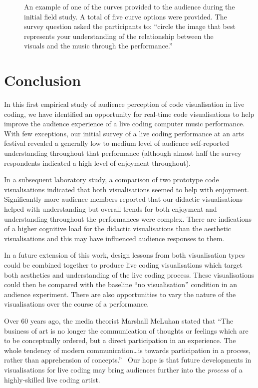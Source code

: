 \documentclass{sig-alternate}
\begin{document}
\begin{figure}
\centering
{}
\caption{An example of one of the curves provided to the audience
during the initial field study. A total of five curve options were
provided. The survey question asked the participants to: ``circle the
image that best represents your understanding of the
relationship between the visuals and the music through the
performance.''}
\label{fig:understanding-over-time}
\end{figure}

\section{Conclusion}

In this first empirical study of audience perception of code
visualisation in live coding, we have identified an opportunity for
real-time code visualisations to help improve the audience experience
of a live coding computer music performance. With few exceptions, our
initial survey of a live coding performance at an arts festival
revealed a generally low to medium level of audience self-reported
understanding throughout that performance (although almost half the
survey respondents indicated a high level of enjoyment throughout).

In a subsequent laboratory study, a comparison of two prototype code
visualisations indicated that both visualisations seemed to help with
enjoyment. Significantly more audience members reported that our
didactic visualisations helped with understanding but overall trends
for both enjoyment and understanding throughout the performances were
complex. There are indications of a higher cognitive load for the
didactic visualisations than the aesthetic visualisations and this may
have influenced audience responses to them.

In a future extension of this work, design lessons from both
visualisation types could be combined together to produce live coding
visualisations which target both aesthetics and understanding of the
live coding process. These visualisations could then be compared with
the baseline ``no visualisation'' condition in an audience experiment.
There are also opportunities to vary the nature of the visualisations
over the course of a performance.

Over 60 years ago, the media theorist Marshall McLuhan stated that
``The business of art is no longer the communication of thoughts or
feelings which are to be conceptually ordered, but a direct
participation in an experience. The whole tendency of modern
communication\ldots is towards participation in a process, rather than
apprehension of concepts.''~\cite{McLuhan} Our hope is that future
developments in visualisations for live coding may bring audiences
further into the \emph{process} of a highly-skilled live coding
artist.
\end{document}
